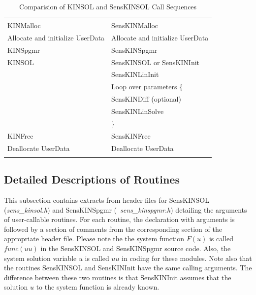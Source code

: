 \documentclass[11pt]{article}
\begin{document}
\begin{table}
\caption{Comparision of KINSOL and SensKINSOL Call Sequences} \label{callseq}
\begin{center}
\begin{tabular}{|l|l|}
\hline
 & \\
KINMalloc & SensKINMalloc \\
Allocate and initialize UserData  & Allocate and initialize UserData \\
KINSpgmr & SensKINSpgmr \\
KINSOL  & SensKINSOL or SensKINInit \\
  & SensKINLinInit \\
  & Loop over parameters \{ \\
  & \hspace{2em}SensKINDiff (optional) \\
  & \hspace{2em}SensKINLinSolve \\
  & \} \\
KINFree & SensKINFree \\
Deallocate UserData  & Deallocate UserData \\
  & \\
\hline
\end{tabular}
\end{center}
\end{table}

\subsection{Detailed Descriptions of Routines}
This subsection contains extracts from header files for SensKINSOL
(\mbox{\em sens\_kinsol.h}) and SensKINSpgmr (\mbox{\em
sens\_kinspgmr.h}) detailing the arguments of user-callable routines.
For each routine, the declaration with arguments is followed by a
section of comments from the corresponding section of the appropriate
header file. Please note the the system function $F(u)$ is called
$func(uu)$ in the SensKINSOL and SensKINSpgmr source code. Also, the
system solution variable $u$ is called $uu$ in coding for these
modules. Note also that the routines SensKINSOL and SensKINInit have
the same calling arguments. The difference between these two routines
is that SensKINInit assumes that the solution $u$ to the system
function is already known.
\end{document}
